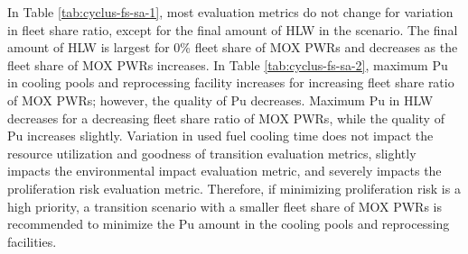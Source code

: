 In Table \ref{tab:cyclus-fs-sa-1}, most evaluation metrics do not change 
for variation in fleet share ratio, except for the final 
amount of HLW in the scenario. 
The final amount of HLW is largest for 0\% fleet share of \gls{MOX} 
\glspl{PWR} and decreases as the fleet share of \gls{MOX} \glspl{PWR} 
increases. 
In Table \ref{tab:cyclus-fs-sa-2}, maximum Pu in cooling pools and 
reprocessing facility 
increases for increasing fleet share ratio of \gls{MOX} \glspl{PWR}; 
however, the quality of Pu decreases. 
Maximum Pu in HLW decreases for a decreasing fleet share ratio
of \gls{MOX} \glspl{PWR}, while the quality of Pu increases slightly.
Variation in used fuel cooling time does not impact the resource utilization 
and goodness of transition evaluation metrics, slightly impacts the environmental 
impact evaluation metric, and severely impacts the proliferation risk evaluation 
metric. 
Therefore, if minimizing proliferation risk is a high priority, 
a transition scenario 
with a smaller fleet share of \gls{MOX} \glspl{PWR} is recommended
to minimize the Pu amount in the cooling pools and reprocessing facilities. 

